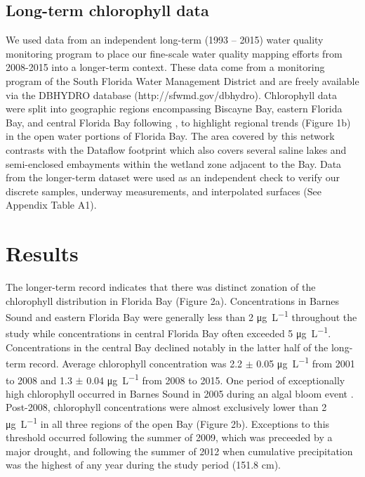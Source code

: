 \subsection{Long-term chlorophyll data}
\label{longtermchl}

We used data from an independent long-term (1993 – 2015) water quality monitoring program to place our fine-scale water quality mapping efforts from 2008-2015 into a longer-term context. These data come from a monitoring program of the South Florida Water Management District and are freely available via the DBHYDRO database (http://sfwmd.gov/dbhydro). Chlorophyll data were split into geographic regions encompassing Biscayne Bay, eastern Florida Bay, and central Florida Bay following \citet{boyer_seasonal_1999}, to highlight regional trends (Figure 1b) in the open water portions of Florida Bay. The area covered by this network contrasts with the Dataflow footprint which also covers several saline lakes and semi-enclosed embayments within the wetland zone adjacent to the Bay. Data from the longer-term dataset were used as an independent check to verify our discrete samples, underway measurements, and interpolated surfaces (See Appendix Table A1).

\section{Results}
\label{results}

The longer-term record indicates that there was distinct zonation of the chlorophyll distribution in Florida Bay (Figure 2a). Concentrations in Barnes Sound and eastern Florida Bay were generally less than 2 \si{\micro\gram\per\liter} throughout the study while concentrations in central Florida Bay often exceeded 5 \si{\micro\gram\per\liter}. Concentrations in the central Bay declined notably in the latter half of the long-term record. Average chlorophyll concentration was 2.2 $\pm$ 0.05 \si{\micro\gram\per\liter} from 2001 to 2008 and 1.3 $\pm$ 0.04 \si{\micro\gram\per\liter} from 2008 to 2015. One period of exceptionally high chlorophyll occurred in Barnes Sound in 2005 during an algal bloom event \citep{rudnick_2006}. Post-2008, chlorophyll concentrations were almost exclusively lower than 2 \si{\micro\gram\per\liter} in all three regions of the open Bay (Figure 2b). Exceptions to this threshold occurred following the summer of 2009, which was preceeded by a major drought, and following the summer of 2012 when cumulative precipitation was the highest of any year during the study period (151.8 cm).  

